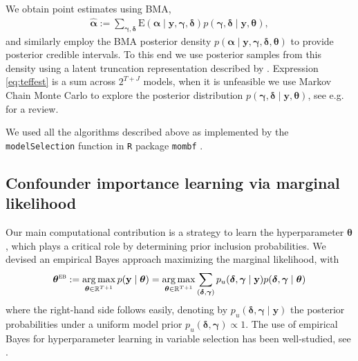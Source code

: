 \documentclass[12pt]{article}
\newcommand{\mb}[1]{\mathbf{#1}}
\DeclareMathOperator*{\argmax}{arg\,max}
\newcommand{\by}{{\mb{y}}}
\newcommand{\balpha}{{\bm{\alpha}}}
\newcommand{\bgamma}{{\bm{\gamma}}}
\newcommand{\bdelta}{{\bm{\delta}}}
\newcommand{\btheta}{{\bm{\theta}}}
\newcommand{\bthetaeb}{\btheta^{\textsc{eb}}}
\newcommand{\omcom}[1]{ {\color{blue} #1} }
\newcommand{\davidcom}[1]{{\color{red} [DR. #1]} }
\begin{document}
We obtain point estimates using BMA,
\begin{align}
\hat{\balpha} := \sum_{\bgamma, \bdelta}  \text{E}(\balpha \mid \by, \bgamma, \bdelta) p(\bgamma, \bdelta \mid \by, \btheta), \label{eq:teffest}
\end{align}
and similarly employ the BMA posterior density $p(\balpha \mid \by, \bgamma, \bdelta, \btheta)$ to provide posterior credible intervals.
To this end we use posterior samples from this density  using a latent truncation representation described by \cite{Rossell17}. 
Expression \eqref{eq:teffest} is a sum across $2^{T+J}$ models, when it is unfeasible we use Markov Chain Monte Carlo to explore the posterior distribution $p(\bgamma,\bdelta \mid \by,\btheta)$,
see e.g. \cite{Clyde12} for a review. 

We used all the algorithms described above as implemented by the \texttt{modelSelection} function in \texttt{R} package \texttt{mombf} \citep{Rossell20}.


\subsection{Confounder importance learning via marginal likelihood}
\label{sec:ml}

Our main computational contribution is a strategy to learn the hyperparameter $\btheta$, which plays a critical role by determining prior inclusion probabilities. We devised an empirical Bayes approach maximizing the marginal likelihood, with
\begin{align}
\bthetaeb := \argmax_{\btheta \in \mathbb{R}^{T+1}} p(\by \mid \btheta)=
\argmax_{\btheta \in \mathbb{R}^{T+1}} \sum_{(\bdelta, \bgamma)} p_{u}(\bdelta, \bgamma \mid \by) p(\bdelta, \bgamma \mid \btheta)
\label{eq:marglik1}
\end{align}
where the right-hand side follows easily, denoting by $p_{u}(\bdelta, \bgamma \mid \by)$ the posterior probabilities under a uniform model prior $p_{u}(\bdelta, \bgamma) \propto 1$.
The use of empirical Bayes for hyperparameter learning in variable selection has been well-studied, see \cite{George00, Scott10, petrone:2014}.
\end{document}
